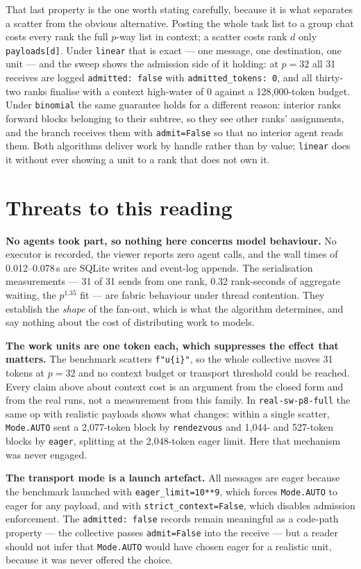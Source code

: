 \documentclass[11pt]{article}
\begin{document}
That last property is the one worth stating carefully, because it is what separates a scatter
from the obvious alternative. Posting the whole task list to a group chat costs every rank the
full $p$-way list in context; a scatter costs rank $d$ only \texttt{payloads[d]}. Under
\texttt{linear} that is exact --- one message, one destination, one unit --- and the sweep shows
the admission side of it holding: at $p=32$ all 31 receives are logged \texttt{admitted: false}
with \texttt{admitted\_tokens: 0}, and all thirty-two ranks finalise with a context high-water of
0 against a 128,000-token budget. Under \texttt{binomial} the same guarantee holds for a
different reason: interior ranks forward blocks belonging to their subtree, so they see other
ranks' assignments, and the branch receives them with \texttt{admit=False} so that no interior
agent reads them. Both algorithms deliver work by handle rather than by value; \texttt{linear}
does it without ever showing a unit to a rank that does not own it.

\section{Threats to this reading}

\textbf{No agents took part, so nothing here concerns model behaviour.} No executor is recorded,
the viewer reports zero agent calls, and the wall times of 0.012--0.078\,s are SQLite writes and
event-log appends. The serialisation measurements --- 31 of 31 sends from one rank, 0.32
rank-seconds of aggregate waiting, the $p^{1.35}$ fit --- are fabric behaviour under thread
contention. They establish the \emph{shape} of the fan-out, which is what the algorithm
determines, and say nothing about the cost of distributing work to models.

\textbf{The work units are one token each, which suppresses the effect that matters.} The
benchmark scatters \verb|f"u{i}"|, so the whole collective moves 31 tokens at $p=32$ and no
context budget or transport threshold could be reached. Every claim above about context cost is an
argument from the closed form and from the real runs, not a measurement from this family. In
\texttt{real-sw-p8-full} the same op with realistic payloads shows what changes: within a single
scatter, \texttt{Mode.AUTO} sent a 2,077-token block by \texttt{rendezvous} and 1,044- and
527-token blocks by \texttt{eager}, splitting at the 2,048-token eager limit. Here that
mechanism was never engaged.

\textbf{The transport mode is a launch artefact.} All messages are eager because the benchmark
launched with \texttt{eager\_limit=10**9}, which forces \texttt{Mode.AUTO} to eager for any
payload, and with \texttt{strict\_context=False}, which disables admission enforcement. The
\texttt{admitted: false} records remain meaningful as a code-path property --- the collective
passes \texttt{admit=False} into the receive --- but a reader should not infer that
\texttt{Mode.AUTO} would have chosen eager for a realistic unit, because it was never offered
the choice.
\end{document}
